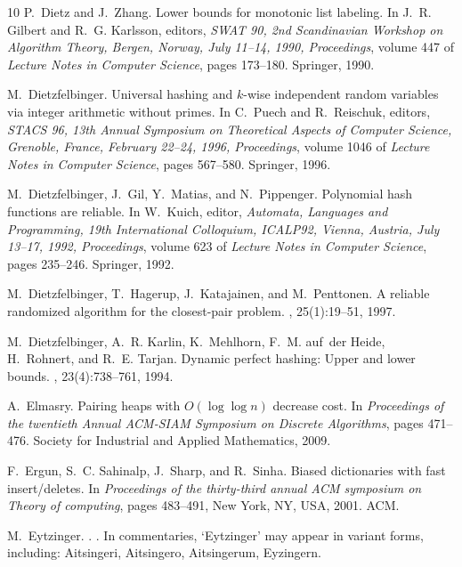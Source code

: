 \documentclass[10pt]{book}
\theoremstyle{plain}
\theoremstyle{definition}
\begin{document}
\begin{thebibliography}{10}
P.~Dietz and J.~Zhang.
\newblock Lower bounds for monotonic list labeling.
\newblock In J.~R. Gilbert and R.~G. Karlsson, editors, {\em SWAT 90, 2nd
  Scandinavian Workshop on Algorithm Theory, Bergen, Norway, July 11--14, 1990,
  Proceedings}, volume 447 of {\em Lecture Notes in Computer Science}, pages
  173--180. Springer, 1990.

M.~Dietzfelbinger.
\newblock Universal hashing and {$k$}-wise independent random variables via
  integer arithmetic without primes.
\newblock In C.~Puech and R.~Reischuk, editors, {\em STACS 96, 13th Annual
  Symposium on Theoretical Aspects of Computer Science, Grenoble, France,
  February 22--24, 1996, Proceedings}, volume 1046 of {\em Lecture Notes in
  Computer Science}, pages 567--580. Springer, 1996.

M.~Dietzfelbinger, J.~Gil, Y.~Matias, and N.~Pippenger.
\newblock Polynomial hash functions are reliable.
\newblock In W.~Kuich, editor, {\em Automata, Languages and Programming, 19th
  International Colloquium, ICALP92, Vienna, Austria, July 13--17, 1992,
  Proceedings}, volume 623 of {\em Lecture Notes in Computer Science}, pages
  235--246. Springer, 1992.

M.~Dietzfelbinger, T.~Hagerup, J.~Katajainen, and M.~Penttonen.
\newblock A reliable randomized algorithm for the closest-pair problem.
, 25(1):19--51, 1997.

M.~Dietzfelbinger, A.~R. Karlin, K.~Mehlhorn, F.~M. auf~der Heide, H.~Rohnert,
  and R.~E. Tarjan.
\newblock Dynamic perfect hashing: Upper and lower bounds.
, 23(4):738--761, 1994.

A.~Elmasry.
\newblock Pairing heaps with {$O(\log\log n)$} decrease cost.
\newblock In {\em Proceedings of the twentieth Annual ACM-SIAM Symposium on
  Discrete Algorithms}, pages 471--476. Society for Industrial and Applied
  Mathematics, 2009.

F.~Ergun, S.~C. Sahinalp, J.~Sharp, and R.~Sinha.
\newblock Biased dictionaries with fast insert/deletes.
\newblock In {\em Proceedings of the thirty-third annual ACM symposium on
  Theory of computing}, pages 483--491, New York, NY, USA, 2001. ACM.

M.~Eytzinger.
.
.
\newblock In commentaries, `Eytzinger' may appear in variant forms, including:
  Aitsingeri, Aitsingero, Aitsingerum, Eyzingern.


\end{thebibliography}
\end{document}
